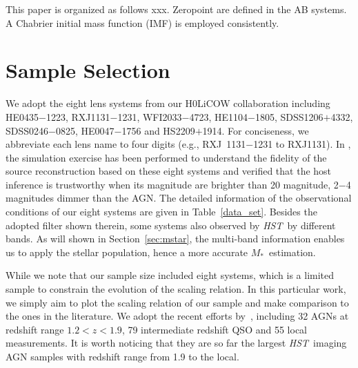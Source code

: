 \documentclass[fleqn,usenatbib]{mnras}
\newcommand{\hst}{{\it HST}}
\newcommand{\mstar}{{$M_*$}}
\begin{document}
This paper is organized as follows xxx. Zeropoint are defined in the AB systems. A Chabrier initial mass function (IMF) is employed consistently. 

\section{Sample Selection}\label{sec:sample_select}
We adopt the eight lens systems from our H0LiCOW collaboration including HE0435$-$1223, RXJ1131$-$1231, WFI2033$-$4723, HE1104$-$1805, SDSS1206$+$4332, SDSS0246$-$0825, HE0047$-$1756 and HS2209$+$1914. For conciseness, we abbreviate each lens name to four digits (e.g., RXJ~1131$-$1231 to RXJ1131). In \citet{Ding2017a}, the simulation exercise has been performed to understand the fidelity of the source reconstruction based on these eight systems and verified that the host inference is trustworthy when its magnitude are brighter than 20 magnitude, 2$-$4 magnitudes dimmer than the AGN. The detailed information of the observational conditions of our eight systems are given in Table~\ref{data_set}. Besides the adopted filter shown therein, some systems also observed by \hst\ by different bands. As will shown in Section~\ref{sec:mstar}, the multi-band information enables us to apply the stellar population, hence a more accurate \mstar\ estimation. 

While we note that our sample size included eight systems, which is a limited sample to constrain the evolution of the scaling relation. In this particular work, we simply aim to plot the scaling relation of our sample and make comparison to the ones in the literature. %
We adopt the recent efforts by~\citet{Ding2020}, including 32 AGNs at redshift range $1.2<z<1.9$, 79 intermediate redshift QSO and 55 local measurements. It is worth noticing that they are so far the largest \hst\ imaging AGN samples with redshift range from 1.9 to the local. 
 
\end{document}
